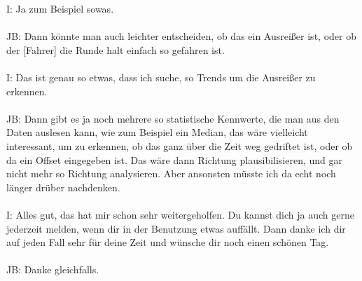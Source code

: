 \begin{linenumbers}
I: Ja zum Beispiel sowas. \\\\
JB: Dann könnte man auch leichter entscheiden, ob das ein Ausreißer ist, oder ob der [Fahrer] die Runde halt einfach so gefahren ist.\\\\
I: Das ist genau so etwas, dass ich suche, so Trends um die Ausreißer zu erkennen.\\\\
JB: Dann gibt es ja noch mehrere so statistische Kennwerte, die man aus den Daten auslesen kann, wie zum Beispiel ein Median, das wäre vielleicht interessant, um zu erkennen, ob das ganz über die Zeit weg gedriftet ist, oder ob da ein Offset eingegeben ist. Das wäre dann Richtung plausibilisieren, und gar nicht mehr so Richtung analysieren. Aber ansonsten müsste ich da echt noch länger drüber nachdenken. \\\\
I: Alles gut, das hat mir schon sehr weitergeholfen. Du kannst dich ja auch gerne jederzeit melden, wenn dir in der Benutzung etwas auffällt. Dann danke ich dir auf jeden Fall sehr für deine Zeit und wünsche dir noch einen schönen Tag.\\\\
JB: Danke gleichfalls.
\end{linenumbers}